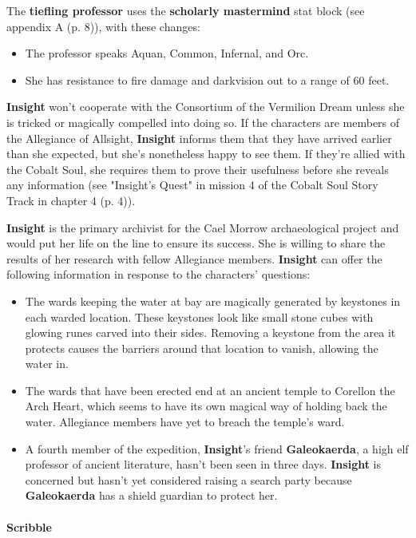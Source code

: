 \documentclass[a4paper, 11pt, bg=full, twocolumn, nooutline]{dndbook}
\begin{document}
The \textbf{tiefling professor} uses the \textbf{scholarly mastermind} stat block (see appendix A (p. 8)), with these changes:

\begin{itemize}
\item The professor speaks Aquan, Common, Infernal, and Orc.
\item She has resistance to fire damage and darkvision out to a range of 60 feet.
\end{itemize}

\textbf{Insight} won't cooperate with the Consortium of the Vermilion Dream unless she is tricked or magically compelled into doing so. If the characters are members of the Allegiance of Allsight, \textbf{Insight} informs them that they have arrived earlier than she expected, but she's nonetheless happy to see them. If they're allied with the Cobalt Soul, she requires them to prove their usefulness before she reveals any information (see "Insight's Quest" in mission 4 of the Cobalt Soul Story Track in chapter 4 (p. 4)).

\textbf{Insight} is the primary archivist for the Cael Morrow archaeological project and would put her life on the line to ensure its success. She is willing to share the results of her research with fellow Allegiance members. \textbf{Insight} can offer the following information in response to the characters' questions:

\begin{itemize}
\item The wards keeping the water at bay are magically generated by keystones in each warded location. These keystones look like small stone cubes with glowing runes carved into their sides. Removing a keystone from the area it protects causes the barriers around that location to vanish, allowing the water in.
\item The wards that have been erected end at an ancient temple to Corellon the Arch Heart, which seems to have its own magical way of holding back the water. Allegiance members have yet to breach the temple's ward.
\item A fourth member of the expedition, \textbf{Insight}'s friend \textbf{Galeokaerda}, a high elf professor of ancient literature, hasn't been seen in three days. \textbf{Insight} is concerned but hasn't yet considered raising a search party because \textbf{Galeokaerda} has a shield guardian to protect her.
\end{itemize}

\paragraph{Scribble}
\end{document}
